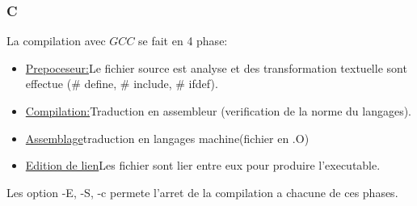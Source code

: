 \documentclass[a4paper,11pt]{article}
\begin{document}
  \subsubsection{C}
    La compilation avec $GCC$ se fait en 4 phase:\\
    \begin{itemize}
      \item \underline{Prepoceseur:}Le fichier source est analyse et des transformation textuelle sont effectue (\# define, \# include, \# ifdef).
      \item \underline{Compilation:}Traduction en assembleur (verification de la norme du langages).
      \item \underline{Assemblage}traduction en langages machine(fichier en .O)
      \item \underline{Edition de lien}Les fichier sont lier entre eux pour produire l'executable.
    \end{itemize}
    Les option -E, -S, -c permete l'arret de la compilation a chacune de ces phases.
\end{document}

